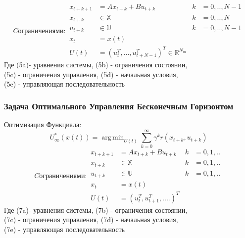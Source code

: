 \documentclass[a4paper,12pt]{article}
\DeclareMathOperator*{\argmin}{arg\,min}
\DeclareMathOperator*{\argmin}{arg\,min}
\begin{document}
\begin{subequations}
C ограничениями:
\begin{align}
    x_{t+k+1} & = Ax_{t+k}+Bu_{t+k}  & k&=0,..,N-1 \\
    x_{t+k} & \in \mathbb{X}  & k&=0,..,N \\
    u_{t+k} & \in \mathbb{U}  & k&=0,..,N-1 \\
    x_t&=x(t) \\
    U(t)&=(u_t^T, ... , u_{t+N-1}^T)^T \in \mathbb{R}^{N_m}
\end{align}
\end{subequations}
Где (5a)- уравнения системы, (5b) - ограничения состоянии, \\ 
\null \qquad (5c) - ограничения управления, (5d) - начальная условия, \\ 
\null \qquad (5e) - управляющая последовательность
\subsubsection{Задача Оптимального Управления Бесконечным Горизонтом}
Оптимизация Функциала:
\begin{equation}
    U_\infty^*(x(t))=\argmin_{U(t)} \sum_{k=0}^{\infty} \gamma^k r(x_{t+k},u_{t+k})
\end{equation}
\begin{subequations}
C ограничениями:
\begin{align}
    x_{t+k+1} & = Ax_{t+k}+Bu_{t+k}  & k&=0,1,.. \\
    x_{t+k} & \in \mathbb{X}  & k&=0,1,.. \\
    u_{t+k} & \in \mathbb{U}  & k&=0,1,.. \\
    x_t&=x(t) \\
    U(t)&=(u_t^T, u_{t+1}^T, ....)^T
\end{align}
\end{subequations}
Где (7a)- уравнения системы, (7b) - ограничения состоянии, \\ 
\null \qquad (7c) - ограничения управления, (7d) - начальная условия, \\ 
\null \qquad (7e) - управляющая последовательность
\newpage
\end{document}
